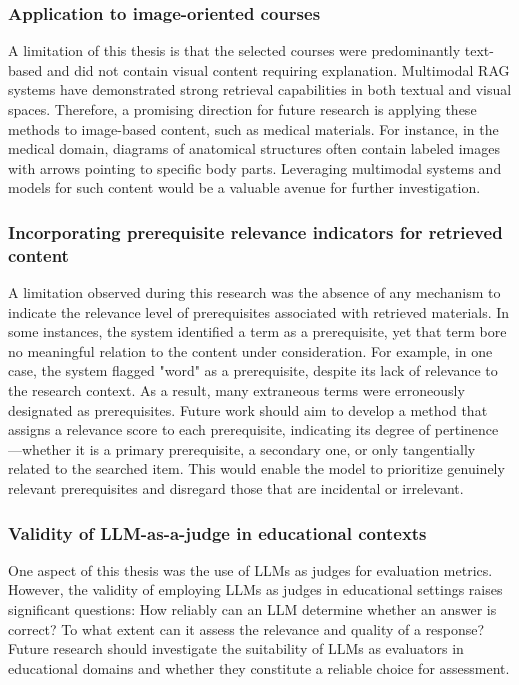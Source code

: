 \subsubsection{Application to image-oriented courses}
A limitation of this thesis is that the selected courses were predominantly text-based and did not contain visual content requiring explanation. Multimodal RAG systems have demonstrated strong retrieval capabilities in both textual and visual spaces. Therefore, a promising direction for future research is applying these methods to image-based content, such as medical materials. For instance, in the medical domain, diagrams of anatomical structures often contain labeled images with arrows pointing to specific body parts. Leveraging multimodal systems and models for such content would be a valuable avenue for further investigation.

\subsubsection{Incorporating prerequisite relevance indicators for retrieved content}
A limitation observed during this research was the absence of any mechanism to indicate the relevance level of prerequisites associated with retrieved materials. In some instances, the system identified a term as a prerequisite, yet that term bore no meaningful relation to the content under consideration. For example, in one case, the system flagged "word" as a prerequisite, despite its lack of relevance to the research context. As a result, many extraneous terms were erroneously designated as prerequisites. Future work should aim to develop a method that assigns a relevance score to each prerequisite, indicating its degree of pertinence---whether it is a primary prerequisite, a secondary one, or only tangentially related to the searched item. This would enable the model to prioritize genuinely relevant prerequisites and disregard those that are incidental or irrelevant.

\subsubsection{Validity of LLM-as-a-judge in educational contexts}
One aspect of this thesis was the use of LLMs as judges for evaluation metrics. However, the validity of employing LLMs as judges in educational settings raises significant questions: How reliably can an LLM determine whether an answer is correct? To what extent can it assess the relevance and quality of a response? Future research should investigate the suitability of LLMs as evaluators in educational domains and whether they constitute a reliable choice for assessment.

